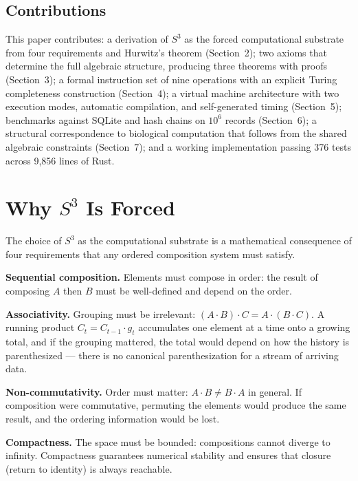 \documentclass[12pt,a4paper]{article}
\begin{document}
\subsection{Contributions}

This paper contributes: a derivation of $S^3$ as the forced computational substrate from four requirements and Hurwitz's theorem (Section~2); two axioms that determine the full algebraic structure, producing three theorems with proofs (Section~3); a formal instruction set of nine operations with an explicit Turing completeness construction (Section~4); a virtual machine architecture with two execution modes, automatic compilation, and self-generated timing (Section~5); benchmarks against SQLite and hash chains on $10^6$ records (Section~6); a structural correspondence to biological computation that follows from the shared algebraic constraints (Section~7); and a working implementation passing 376 tests across 9,856 lines of Rust.


\section{Why $S^3$ Is Forced}

The choice of $S^3$ as the computational substrate is a mathematical consequence of four requirements that any ordered composition system must satisfy.

\textbf{Sequential composition.} Elements must compose in order: the result of composing $A$ then $B$ must be well-defined and depend on the order.

\textbf{Associativity.} Grouping must be irrelevant: $(A \cdot B) \cdot C = A \cdot (B \cdot C)$. A running product $C_t = C_{t-1} \cdot g_t$ accumulates one element at a time onto a growing total, and if the grouping mattered, the total would depend on how the history is parenthesized --- there is no canonical parenthesization for a stream of arriving data.

\textbf{Non-commutativity.} Order must matter: $A \cdot B \neq B \cdot A$ in general. If composition were commutative, permuting the elements would produce the same result, and the ordering information would be lost.

\textbf{Compactness.} The space must be bounded: compositions cannot diverge to infinity. Compactness guarantees numerical stability and ensures that closure (return to identity) is always reachable.
\end{document}

